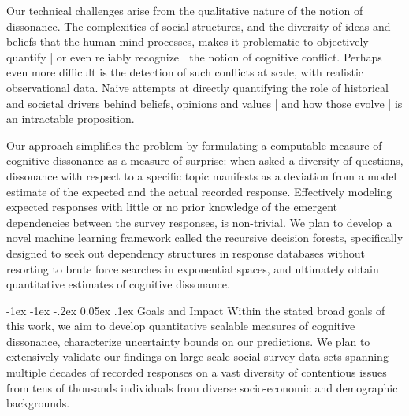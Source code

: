 \documentclass[onecolumn, compsoc,11pt]{IEEEtran}
\makeatletter
\renewcommand\section{\@startsection {section}{1}{\z@}%
                                   {-1ex \@plus -1ex \@minus -.2ex}%
                                   {0.05ex \@plus.1ex}%
                                   {\large\bfseries\scshape}}
\makeatother
\begin{document}

Our technical challenges  arise  from the qualitative nature of the notion of dissonance. The  complexities of social structures, and the diversity of ideas and beliefs that the human mind processes,  makes it  problematic to objectively  quantify | or even reliably recognize |  the notion of cognitive conflict. Perhaps even more difficult is the detection of  such conflicts at scale, with realistic observational data.  Naive attempts at directly quantifying the role of  historical and societal  drivers behind  beliefs, opinions and values | and how those  evolve |  is an intractable proposition.

Our approach simplifies the problem by formulating  a computable measure of cognitive dissonance as a measure of surprise: when asked a diversity of questions, dissonance with respect to a specific topic manifests as a deviation from a model estimate of the expected and the actual recorded response. Effectively modeling  expected responses with little or no prior knowledge of the emergent dependencies between the survey responses, is  non-trivial. We plan to develop a novel machine learning  framework called the recursive decision forests,  specifically designed to seek out dependency structures in response databases without resorting to brute force searches in exponential spaces, and ultimately obtain quantitative estimates of cognitive dissonance.




\section{Goals and Impact}
Within the stated broad goals of this work, we aim to develop quantitative scalable  measures of cognitive dissonance, characterize uncertainty bounds on our predictions. We plan to extensively validate our findings on large scale social survey data sets spanning multiple decades of recorded responses on a vast diversity of contentious issues from tens of thousands individuals from diverse socio-economic and demographic backgrounds. 
\end{document}
